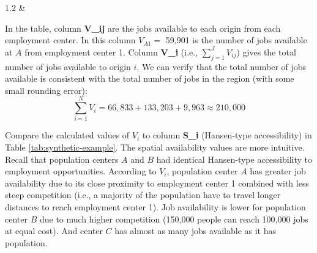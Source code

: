 \documentclass[]{elsarticle} %
\begin{document}
\begin{table}[ht]
\begin{centerbox}
\begin{threeparttable}
\begin{tabularx}{1.2\textwidth}
 &
 \tabularnewline[-0.5pt]


\end{tabularx}
\end{threeparttable}\par\end{centerbox}

\end{table}
 

In the table, column \textbf{V\_ij} are the jobs available to each
origin from each employment center. In this column \(V_{A1}=\) 59,901 is
the number of jobs available at \(A\) from employment center 1. Column
\textbf{V\_i} (i.e., \(\sum_{j=1}^JV_{ij}\)) gives the total number of
jobs available to origin \(i\). We can verify that the total number of
jobs available is consistent with the total number of jobs in the region
(with some small rounding error): \[
\sum_{i=1}^N V_i = 66,833 + 133,203 + 9,963 \approx 210,000 
\]

Compare the calculated values of \(V_i\) to column \textbf{S\_i}
(Hansen-type accessibility) in Table \ref{tab:synthetic-example}. The
spatial availability values are more intuitive. Recall that population
centers \(A\) and \(B\) had identical Hansen-type accessibility to
employment opportunities. According to \(V_i\), population center \(A\)
has greater job availability due to its close proximity to employment
center 1 combined with less steep competition (i.e., a majority of the
population have to travel longer distances to reach employment center
1). Job availability is lower for population center \(B\) due to much
higher competition (150,000 people can reach 100,000 jobs at equal
cost). And center \(C\) has almost as many jobs available as it has
population.
\end{document}
